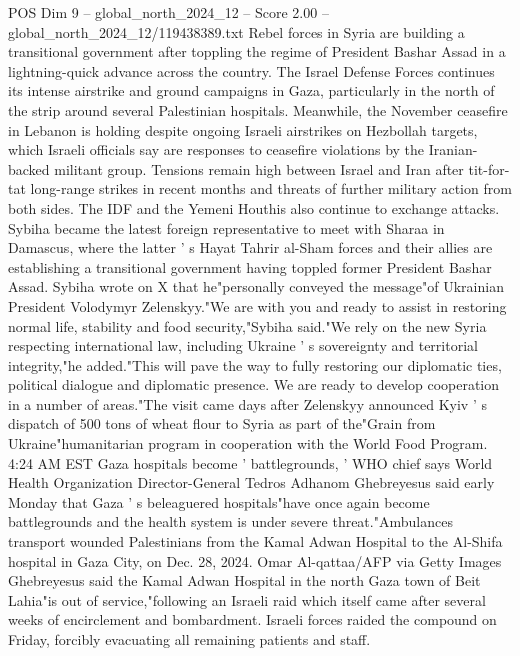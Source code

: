 \begin{textsample}{POS Dim 9 – global\_north\_2024\_12 – Score 2.00 – global\_north\_2024\_12/119438389.txt}  \label{ex:f9_pos_331}
Rebel forces in Syria are building a transitional government after toppling the regime of President Bashar Assad in a lightning-quick advance across the country.
The Israel Defense Forces continues its intense airstrike and ground campaigns in Gaza, particularly in the north of the strip around several Palestinian hospitals.
Meanwhile, the November ceasefire in Lebanon is holding despite ongoing Israeli airstrikes on Hezbollah targets, which Israeli officials say are responses to ceasefire violations by the Iranian-backed militant group.
Tensions remain high between Israel and Iran after tit-for-tat long-range strikes in recent months and threats of further military action from both sides.
The IDF and the Yemeni Houthis also continue to exchange attacks.
Sybiha became the latest foreign representative to meet with Sharaa in Damascus, where the latter ' s Hayat Tahrir al-Sham forces and their allies are establishing a transitional government having toppled former President Bashar Assad.
Sybiha wrote on X that he"personally conveyed the message"of Ukrainian President Volodymyr Zelenskyy."We are with you and ready to assist in restoring normal life, stability and food security,"Sybiha said."We rely on the new Syria respecting international law, including Ukraine ' s sovereignty and territorial integrity,"he added."This will pave the way to fully restoring our diplomatic ties, political dialogue and diplomatic presence.
We are ready to develop cooperation in a number of areas."The visit came days after Zelenskyy announced Kyiv ' s dispatch of 500 tons of wheat flour to Syria as part of the"Grain from Ukraine"humanitarian program in cooperation with the World Food Program. 4:24 AM EST Gaza hospitals become ' battlegrounds, ' WHO chief says World Health Organization Director-General Tedros Adhanom Ghebreyesus said early Monday that Gaza ' s beleaguered hospitals"have once again become battlegrounds and the health system is under severe threat."Ambulances transport wounded Palestinians from the Kamal Adwan Hospital to the Al-Shifa hospital in Gaza City, on Dec. 28, 2024.
Omar Al-qattaa/AFP via Getty Images Ghebreyesus said the Kamal Adwan Hospital in the north Gaza town of Beit Lahia"is out of service,"following an Israeli raid which itself came after several weeks of encirclement and bombardment.
Israeli forces raided the compound on Friday, forcibly evacuating all remaining patients and staff.

\end{textsample}
